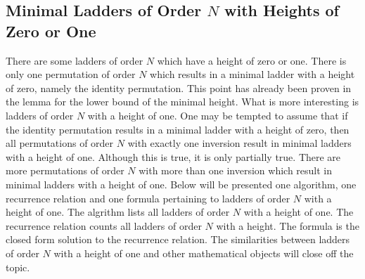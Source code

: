 \begin{center}
\begin{figure}[!htp]
        \end{figure}
   \end{center}


   \subsection{Minimal Ladders of Order $N$ with Heights of Zero or One}
   There are some ladders of order $N$ which have a height of zero or one.
   There is only one permutation of order $N$ which results in a minimal ladder with a height of zero, 
   namely the identity permutation. This point has already been proven in the lemma for the lower bound of the 
   minimal height. What is more interesting is ladders of order $N$ with a height of one. 
   One may be tempted to assume that if the identity permutation results in a minimal ladder 
   with a height of zero, then all permutations of order $N$ with exactly one inversion result in minimal ladders with a height of one.
   Although this is true, it is only partially true. There are more permutations of order $N$ with more than one inversion 
   which result in minimal ladders with a height of one. Below will be presented one algorithm, one recurrence relation and one formula pertaining 
   to ladders of order $N$ with a height of one. The algrithm lists all ladders of order $N$ with a height of one. The recurrence relation
   counts all ladders of order $N$ with a height. The formula is the closed 
   form solution to the recurrence relation. The similarities between ladders of order $N$ with a height of one and other mathematical 
   objects will close off the topic.\par 

